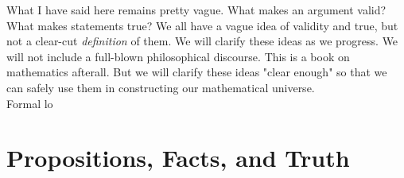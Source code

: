     What I have said here remains pretty vague. What makes an argument valid? What makes statements true? We all have a vague idea of validity and true, but not a clear-cut \textit{definition} of them. We will clarify these ideas as we progress. We will not include a full-blown philosophical discourse. This is a book on mathematics afterall. But we will clarify these ideas "clear enough" so that we can safely use them in constructing our mathematical universe.\\
    Formal lo
    \section{Propositions, Facts, and Truth}